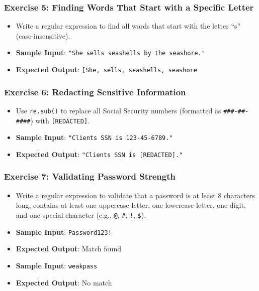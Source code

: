 \documentclass[
  letterpaper,
  DIV=11,
  numbers=noendperiod]{scrreprt}
\providecommand{\tightlist}{%
  \setlength{\itemsep}{0pt}\setlength{\parskip}{0pt}}\usepackage{longtable,booktabs,array}
\begin{document}
\hypertarget{exercise-5-finding-words-that-start-with-a-specific-letter}{%
\subsubsection{Exercise 5: Finding Words That Start with a Specific
Letter}\label{exercise-5-finding-words-that-start-with-a-specific-letter}}

\begin{itemize}
\tightlist
\item
  Write a regular expression to find all words that start with the
  letter ``s'' (case-insensitive).
\item
  \textbf{Sample Input}:
  \texttt{"She\ sells\ seashells\ by\ the\ seashore."}
\item
  \textbf{Expected Output}:
  \texttt{{[}\textquotesingle{}She\textquotesingle{},\ \textquotesingle{}sells\textquotesingle{},\ \textquotesingle{}seashells\textquotesingle{},\ \textquotesingle{}seashore\textquotesingle{}{]}}
\end{itemize}

\hypertarget{exercise-6-redacting-sensitive-information}{%
\subsubsection{Exercise 6: Redacting Sensitive
Information}\label{exercise-6-redacting-sensitive-information}}

\begin{itemize}
\tightlist
\item
  Use \texttt{re.sub()} to replace all Social Security numbers
  (formatted as \texttt{\#\#\#-\#\#-\#\#\#\#}) with
  \texttt{{[}REDACTED{]}}.
\item
  \textbf{Sample Input}:
  \texttt{"Client\textquotesingle{}s\ SSN\ is\ 123-45-6789."}
\item
  \textbf{Expected Output}:
  \texttt{"Client\textquotesingle{}s\ SSN\ is\ {[}REDACTED{]}."}
\end{itemize}

\hypertarget{exercise-7-validating-password-strength}{%
\subsubsection{Exercise 7: Validating Password
Strength}\label{exercise-7-validating-password-strength}}

\begin{itemize}
\tightlist
\item
  Write a regular expression to validate that a password is at least 8
  characters long, contains at least one uppercase letter, one lowercase
  letter, one digit, and one special character (e.g., \texttt{@},
  \texttt{\#}, \texttt{!}, \texttt{\$}).
\item
  \textbf{Sample Input}: \texttt{Password123!}
\item
  \textbf{Expected Output}: Match found
\item
  \textbf{Sample Input}: \texttt{weakpass}
\item
  \textbf{Expected Output}: No match
\end{itemize}
\end{document}
